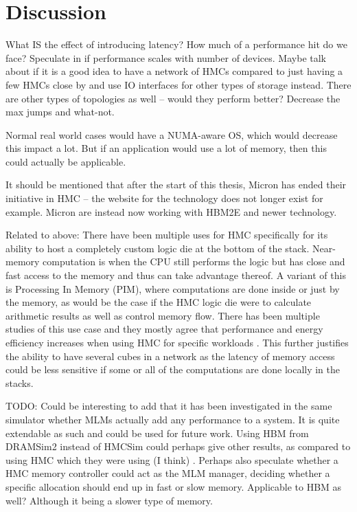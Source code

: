 \chapter{Discussion}
What IS the effect of introducing latency? How much of a performance hit do we face? Speculate in if performance scales with number of devices. Maybe talk about if it is a good idea to have a network of HMCs compared to just having a few HMCs close by and use IO interfaces for other types of storage instead. There are other types of topologies as well -- would they perform better? Decrease the max jumps and what-not.

Normal real world cases would have a NUMA-aware OS, which would decrease this impact a lot. But if an application would use a lot of memory, then this could actually be applicable. 

It should be mentioned that after the start of this thesis, Micron has ended their initiative in HMC -- the website for the technology does not longer exist for example. Micron are instead now working with HBM2E and newer technology. 

Related to above: There have been multiple uses for HMC specifically for its ability to host a completely custom logic die at the bottom of the stack. Near-memory computation is when the CPU still performs the logic but has close and fast access to the memory and thus can take advantage thereof. A variant of this is Processing In Memory (PIM), where computations are done inside or just by the memory, as would be the case if the HMC logic die were to calculate arithmetic results as well as control memory flow. There has been multiple studies of this use case and they mostly agree that performance and energy efficiency increases when using HMC for specific workloads \cite{7917248} \cite{Min:2019:NEH:3287624.3287642} \cite{7804052} \cite{oliveira2017nim}. This further justifies the ability to have several cubes in a network as the latency of memory access could be less sensitive if some or all of the computations are done locally in the stacks.

TODO: Could be interesting to add that it has been investigated in the same simulator whether MLMs actually add any performance to a system. It is quite extendable as such and could be used for future work. Using HBM from DRAMSim2 instead of HMCSim could perhaps give other results, as compared to using HMC which they were using (I think) \cite{Awad:2017:PAU:3132402.3132422}. Perhaps also speculate whether a HMC memory controller could act as the MLM manager, deciding whether a specific allocation should end up in fast or slow memory. Applicable to HBM as well? Although it being a slower type of memory.